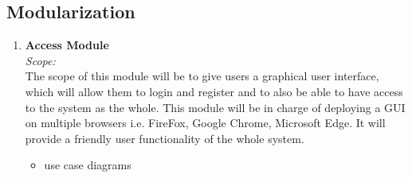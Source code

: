 \documentclass{article}
\begin{document}
	\subsection{Modularization}
		\begin{enumerate}
			\item \textbf{Access Module} \\
							\textit{Scope:}\\
							 The scope of this module will be to give users a graphical user interface, which will allow them to login and register and to also be able to have access to the system as the whole. This module will be in charge of deploying a GUI on multiple browsers i.e. FireFox, Google Chrome, Microsoft Edge. It will provide a friendly user functionality of the whole system.  
\begin{itemize}
						\item use case diagrams\\
								\begin{figure}[h]


\end{figure}
\end{itemize}
\end{enumerate}
\end{document}

